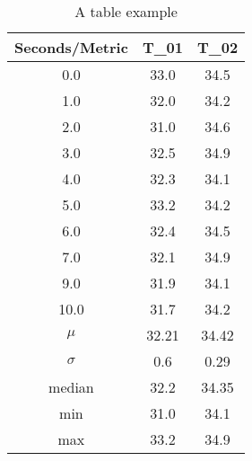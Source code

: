 \begin{table}[H]
\begin{center}
\begin{tabular}{c|cc}
\toprule
Seconds/Metric & T\_01 & T\_02 \\
\midrule
0.0 & 33.0 & 34.5 \\ 
1.0 & 32.0 & 34.2 \\ 
2.0 & 31.0 & 34.6 \\ 
3.0 & 32.5 & 34.9 \\ 
4.0 & 32.3 & 34.1 \\ 
5.0 & 33.2 & 34.2 \\ 
6.0 & 32.4 & 34.5 \\ 
7.0 & 32.1 & 34.9 \\ 
9.0 & 31.9 & 34.1 \\ 
10.0 & 31.7 & 34.2 \\ 
\midrule 
$\mu$ & 32.21 & 34.42 \\ 
$\sigma$ & 0.6 & 0.29 \\ 
median & 32.2 & 34.35 \\ 
min & 31.0 & 34.1 \\ 
max & 33.2 & 34.9 \\
\bottomrule
\end{tabular}
\end{center}
\caption{A table example}
\label{tab:a-table-example}
\end{table}
